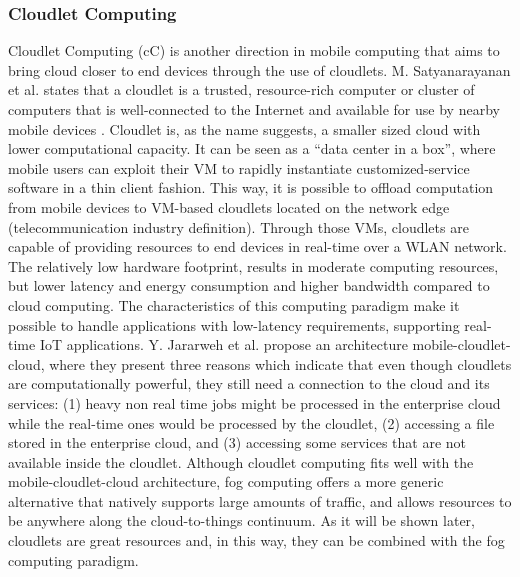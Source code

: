 \subsubsection{Cloudlet Computing}
\noindent Cloudlet Computing (cC) is another direction in mobile computing that aims to bring cloud closer to end devices through the use of cloudlets. M. Satyanarayanan et al. states that a cloudlet is a trusted, resource-rich computer or cluster of computers that is well-connected to the Internet and available for use by nearby mobile devices \cite{satyanarayanan2009case}. Cloudlet is, as the name suggests, a smaller sized cloud with lower computational capacity. It can be seen as a ``data center in a box'', where mobile users can exploit their VM to rapidly instantiate customized-service software in a thin client fashion. This way, it is possible to offload computation from mobile devices to VM-based cloudlets located on the network edge (telecommunication industry definition). Through those VMs, cloudlets are capable of providing resources to end devices in real-time over a WLAN network. The relatively low hardware footprint, results in moderate computing resources, but lower latency and energy consumption and higher bandwidth compared to cloud computing. The characteristics of this computing paradigm make it possible to handle applications with low-latency requirements, supporting real-time IoT applications. Y. Jararweh et al. \cite{jararweh2013resource} propose an architecture mobile-cloudlet-cloud, where they present three reasons which indicate that even though cloudlets are computationally powerful, they still need a connection to the cloud and its services: (1) heavy non real time jobs might be processed in the enterprise cloud while the real-time ones would be processed by the cloudlet, (2) accessing a file stored in the enterprise cloud, and (3) accessing some services that are not available inside the cloudlet. Although cloudlet computing fits well with the mobile-cloudlet-cloud architecture, fog computing offers a more generic alternative that natively supports large amounts of traffic, and allows resources to be anywhere along the cloud-to-things continuum. As it will be shown later, cloudlets are great resources and, in this way, they can be combined with the fog computing paradigm.

